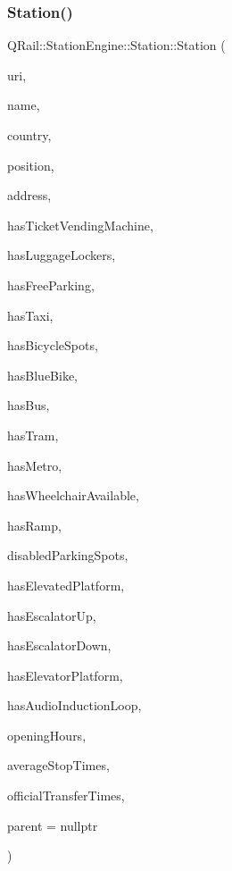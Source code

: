 \subsubsection{\texorpdfstring{Station()}{Station()}\hspace{0.1cm}{\footnotesize\ttfamily [3/5]}}
{\footnotesize\ttfamily Q\+Rail\+::\+Station\+Engine\+::\+Station\+::\+Station (\begin{DoxyParamCaption}\item[{const Q\+Url \&}]{uri,  }\item[{const Q\+Map$<$ Q\+Locale\+::\+Language, Q\+String $>$ \&}]{name,  }\item[{const Q\+Locale\+::\+Country \&}]{country,  }\item[{const Q\+Geo\+Coordinate \&}]{position,  }\item[{const Q\+Geo\+Address \&}]{address,  }\item[{const bool \&}]{has\+Ticket\+Vending\+Machine,  }\item[{const bool \&}]{has\+Luggage\+Lockers,  }\item[{const bool \&}]{has\+Free\+Parking,  }\item[{const bool \&}]{has\+Taxi,  }\item[{const bool \&}]{has\+Bicycle\+Spots,  }\item[{const bool \&}]{has\+Blue\+Bike,  }\item[{const bool \&}]{has\+Bus,  }\item[{const bool \&}]{has\+Tram,  }\item[{const bool \&}]{has\+Metro,  }\item[{const bool \&}]{has\+Wheelchair\+Available,  }\item[{const bool \&}]{has\+Ramp,  }\item[{const qint16 \&}]{disabled\+Parking\+Spots,  }\item[{const bool \&}]{has\+Elevated\+Platform,  }\item[{const bool \&}]{has\+Escalator\+Up,  }\item[{const bool \&}]{has\+Escalator\+Down,  }\item[{const bool \&}]{has\+Elevator\+Platform,  }\item[{const bool \&}]{has\+Audio\+Induction\+Loop,  }\item[{const Q\+Map$<$ \mbox{\hyperlink{classQRail_1_1StationEngine_1_1Station_ae8c109a1d5ce2bb41959e62e32392631}{Station\+Engine\+::\+Station\+::\+Day}}, Q\+Pair$<$ Q\+Time, Q\+Time $>$$>$ \&}]{opening\+Hours,  }\item[{const qreal \&}]{average\+Stop\+Times,  }\item[{const quint32 \&}]{official\+Transfer\+Times,  }\item[{Q\+Object $\ast$}]{parent = {\ttfamily nullptr} }\end{DoxyParamCaption})\hspace{0.3cm}{\ttfamily [explicit]}}



